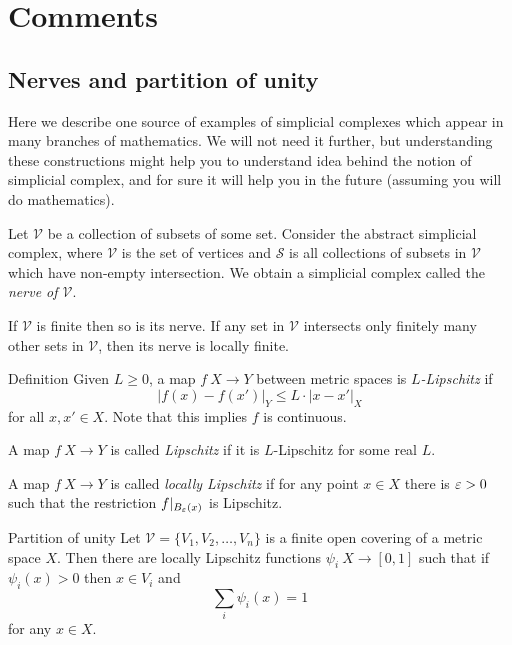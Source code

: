 \section{Comments}

\subsection*{Nerves and partition of unity}

Here we describe one source of examples of simplicial complexes which appear in 
 many branches of mathematics.
We will not need it further, but understanding these constructions might help you to understand idea behind the notion of simplicial complex, and for sure it will help you in the future (assuming you will do mathematics).

Let $\mathcal{V}$ be a collection of subsets of some set.
Consider the abstract simplicial complex, where $\mathcal{V}$ is the set of vertices and 
$\mathcal{S}$ is all collections of subsets in $\mathcal{V}$ which have non-empty intersection.
We obtain a simplicial complex called the \emph{nerve of $\mathcal{V}$}.

If $\mathcal{V}$ is finite then so is its nerve.
If any set in $\mathcal{V}$ intersects only finitely many other sets in $\mathcal{V}$, then 
its nerve is locally finite.

\begin{thm}{Definition}
 Given $L \geq 0$,  a map $f\:X \to Y$ between metric spaces is \emph{$L$-Lipschitz} if $$|f(x) - f(x')|_Y \leq L\cdot|x - x'|_X$$ for all $x, x' \in X$.  Note that this implies $f$ is continuous.

A map $f\:X \to Y$ is called \emph{Lipschitz} if it is $L$-Lipschitz for some real $L$.

A map $f\:X \to Y$ is called \emph{locally Lipschitz} if for any point $x\in X$ there is $\varepsilon>0$ such that the restriction $f|_{B_\varepsilon(x)}$ is Lipschitz.
\end{thm}

\begin{thm}{Partition of unity}\label{thm:part-unit}
 Let $\mathcal{V}=\{V_1,V_2,\dots,V_n\}$ is a finite open covering of a metric space $X$.
Then there are locally Lipschitz functions $\psi_i\:X\to[0,1]$ such that
if $\psi_i(x)>0$ then $x\in V_i$ and
$$\sum_i\psi_i(x)=1$$
for any $x\in X$.
\end{thm}


